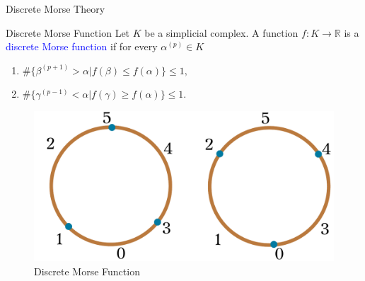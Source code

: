 \documentclass[9pt,sans-serif]{beamer}
\begin{document}
\begin{frame}{Discrete Morse Theory}
  \begin{block}{Discrete Morse Function}
    Let $K$ be a simplicial complex. A function $f:K\to\mathbb R$ is a
    \textcolor{blue}{discrete Morse function} if for every $\alpha^{(p)}\in K$
    \begin{enumerate}
    \item $\#\{\beta^{(p+1)}>\alpha | f(\beta)\leq   f(\alpha)\}\leq 1,$
    \item $\#\{\gamma^{(p-1)}<\alpha | f(\gamma)\geq f(\alpha)\}\leq 1.$ 
    \end{enumerate}
  \end{block}
  
  \pause
  
  \begin{figure}[htb]
    \centering \includegraphics[scale=0.5]{discreteMorse}
    \caption{Discrete Morse Function}
  \end{figure}
  
\end{frame}
\end{document}

